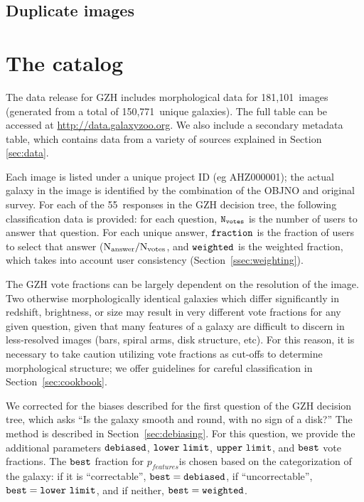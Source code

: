 \documentclass[usenatbib]{mn2e}
\begin{document}
\subsection{Duplicate images}

\section{The catalog}\label{sec:results}

The data release for GZH includes morphological data for 181,101~images (generated from a total of 150,771~unique galaxies). The full table can be accessed at \url{http://data.galaxyzoo.org}. We also include a secondary metadata table, which contains data from a variety of sources explained in Section \ref{sec:data}.

Each image is listed under a unique project ID (eg AHZ000001); the actual galaxy in the image is identified by the combination of the OBJNO and original survey. For each of the 55~responses in the GZH decision tree, the following classification data is provided: for each question, $\tt N_{votes}$ is the number of users to answer that question. For each unique answer, $\tt fraction$ is the fraction of users to select that answer ($\rm N_{answer}/N_{votes}$, and $\tt weighted$ is the weighted fraction, which takes into account user consistency (Section~\ref{ssec:weighting}). 

The GZH vote fractions can be largely dependent on the resolution of the image. Two otherwise morphologically identical galaxies which differ significantly in redshift, brightness, or size may result in very different vote fractions for any given question, given that many features of a galaxy are difficult to discern in less-resolved images (bars, spiral arms, disk structure, etc). For this reason, it is necessary to take caution utilizing vote fractions as cut-offs to determine morphological structure; we offer guidelines for careful classification in Section~\ref{sec:cookbook}. 

We corrected for the biases described for the first question of the GZH decision tree, which asks ``Is the galaxy smooth and round, with no sign of a disk?'' The method is described in Section~\ref{sec:debiasing}. For this question, we provide the additional parameters $\tt debiased$, $\tt lower~limit$, $\tt upper~limit$, and $\tt best$ vote fractions. The $\tt best$ fraction for $p_{features}$is chosen based on the categorization of the galaxy: if it is ``correctable'', $\tt best = debiased$, if ``uncorrectable'', $\tt best = lower~limit$, and if neither, $\tt best = weighted$. 
\end{document}
